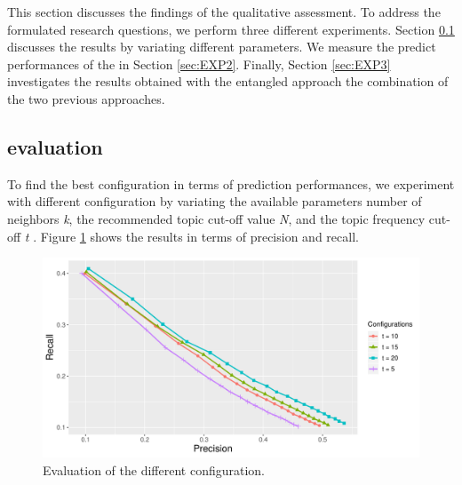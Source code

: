 This section discusses the findings of the qualitative assessment. To address the formulated research questions, we perform three different experiments. Section \ref{sec:EXP1} discusses the \CT results by variating different parameters.  We measure the predict performances of the \MNB in Section \ref{sec:EXP2}. Finally, Section \ref{sec:EXP3} investigates the results obtained with the entangled approach \ie the combination of the two previous approaches. 


\subsection{\CT evaluation} \label{sec:EXP1}
 \rqfirst
To find the best configuration in terms of prediction performances, we experiment with different \CT configuration by variating the available parameters \ie number of neighbors \emph{k}, the recommended topic cut-off value \emph{N}, and the topic frequency cut-off \emph{t} .  %
Figure \ref{fig:configs} shows the results  in terms of precision and recall. 
\begin{figure}[t!]
	\centering
	\includegraphics[width=\linewidth]{figs/PrecisionRecallCurve.pdf}
	\caption{Evaluation of the different configuration.}
	\label{fig:configs}
\end{figure}
